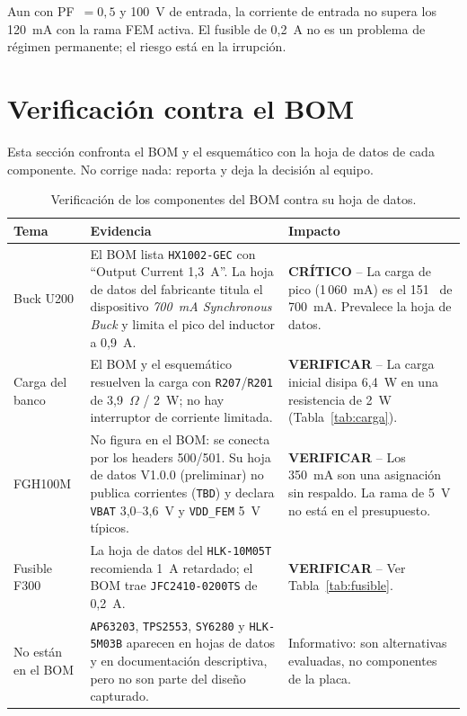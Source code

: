 \documentclass[11pt,a4paper]{article}
\newcommand{\pct}{\text{\char37}}
\newcommand{\revisar}{\textcolor{warn}{\textbf{VERIFICAR}}}
\newcommand{\critico}{\textcolor{red!75!black}{\textbf{CRÍTICO}}}
\begin{document}
\noindent Aun con PF~$=0{,}5$ y 100~V de entrada, la corriente de entrada no
supera los 120~mA con la rama FEM activa. El fusible de 0,2~A no es un problema
de régimen permanente; el riesgo está en la irrupción.

\section{Verificación contra el BOM}
\label{sec:discrepancias}

Esta sección confronta el BOM y el esquemático con la hoja de datos de cada
componente. No corrige nada: reporta y deja la decisión al equipo.

\begin{table}[H]
\centering
\caption{Verificación de los componentes del BOM contra su hoja de datos.}
\label{tab:discrepancias}
\small
\begin{tabularx}{\textwidth}{@{}>{\raggedright\arraybackslash}p{2.7cm}X>{\raggedright\arraybackslash}p{3.3cm}@{}}
\toprule
\textbf{Tema} & \textbf{Evidencia} & \textbf{Impacto} \\
\midrule
Buck U200 & El BOM lista \texttt{HX1002-GEC} con ``Output Current 1,3~A''. La hoja de datos del fabricante titula el dispositivo \emph{700~mA Synchronous Buck} y limita el pico del inductor a 0,9~A. & \critico{} -- La carga de pico (1\,060~mA) es el 151~\pct{} de 700~mA. Prevalece la hoja de datos. \\
\addlinespace
Carga del banco & El BOM y el esquemático resuelven la carga con \texttt{R207}/\texttt{R201} de 3,9~$\Omega$ / 2~W; no hay interruptor de corriente limitada. & \revisar{} -- La carga inicial disipa 6,4~W en una resistencia de 2~W (Tabla~\ref{tab:carga}). \\
\addlinespace
FGH100M & No figura en el BOM: se conecta por los headers 500/501. Su hoja de datos V1.0.0 (preliminar) no publica corrientes (\texttt{TBD}) y declara \texttt{VBAT} 3,0--3,6~V y \texttt{VDD\_FEM} 5~V típicos. & \revisar{} -- Los 350~mA son una asignación sin respaldo. La rama de 5~V no está en el presupuesto. \\
\addlinespace
Fusible F300 & La hoja de datos del \texttt{HLK-10M05T} recomienda 1~A retardado; el BOM trae \texttt{JFC2410-0200TS} de 0,2~A. & \revisar{} -- Ver Tabla~\ref{tab:fusible}. \\
\addlinespace
No están en el BOM & \texttt{AP63203}, \texttt{TPS2553}, \texttt{SY6280} y \texttt{HLK-5M03B} aparecen en hojas de datos y en documentación descriptiva, pero no son parte del diseño capturado. & Informativo: son alternativas evaluadas, no componentes de la placa. \\
\bottomrule
\end{tabularx}
\end{table}
\end{document}
